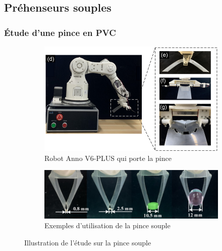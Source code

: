 \documentclass[a4paper, 11pt]{report}
\begin{document}
    \subsection{Préhenseurs souples}

        \subsubsection{Étude d'une pince en PVC}
            
            \begin{figure}[htbp]
                    \centering
                    \begin{subfigure}[t]{0.8\textwidth}
                        \centering
                        \includegraphics[width=\textwidth]{Figures/robot.png}
                        \caption{Robot Anno V6-PLUS qui porte la pince \cite{liu_origami_2023}}
                    \end{subfigure}
                    \hfill
                    \begin{subfigure}[t]{0.8\textwidth}
                        \centering
                        \includegraphics[width=\textwidth]{Figures/adaptability.png}
                        \caption{Exemples d'utilisation de la pince souple \cite{liu_origami_2023}}
                    \end{subfigure}
                    \caption{Illustration de l'étude sur la pince souple}
                    \label{fig:origami}
                \end{figure}
        
\end{document}
